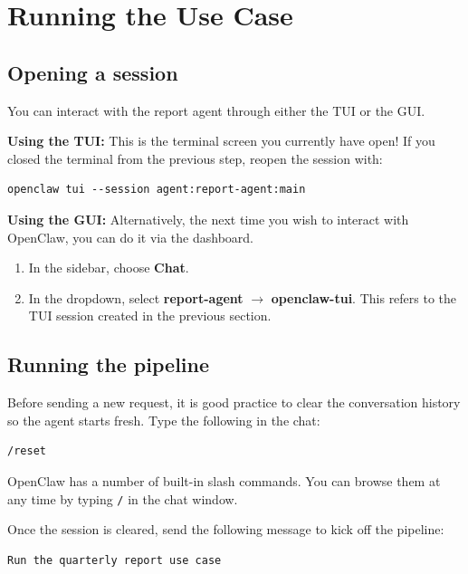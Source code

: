 \documentclass[12pt, a4paper]{article}
\begin{document}
\clearpage

\section{Running the Use Case}

\subsection{Opening a session}

You can interact with the report agent through either the TUI or the GUI.

\textbf{Using the TUI:} This is the terminal screen you currently have open! If you closed the terminal from the previous step, reopen the session with:

\begin{lstlisting}[style=shellstyle]
openclaw tui --session agent:report-agent:main
\end{lstlisting}

\textbf{Using the GUI:} Alternatively, the next time you wish to interact with OpenClaw, you can do it via the dashboard.
\begin{enumerate}[leftmargin=1.5em]
\item In the sidebar, choose \textbf{Chat}.
\item In the dropdown, select \textbf{report-agent} $\to$ \textbf{openclaw-tui}. This refers to the TUI session created in the previous section.
\end{enumerate}

\subsection{Running the pipeline}

Before sending a new request, it is good practice to clear the conversation history so the agent starts fresh. Type the following in the chat:

\begin{lstlisting}[style=plainstyle]
/reset
\end{lstlisting}

OpenClaw has a number of built-in slash commands. You can browse them at any time by typing \texttt{/} in the chat window.

Once the session is cleared, send the following message to kick off the pipeline:

\begin{lstlisting}[style=plainstyle]
Run the quarterly report use case
\end{lstlisting}
\end{document}
